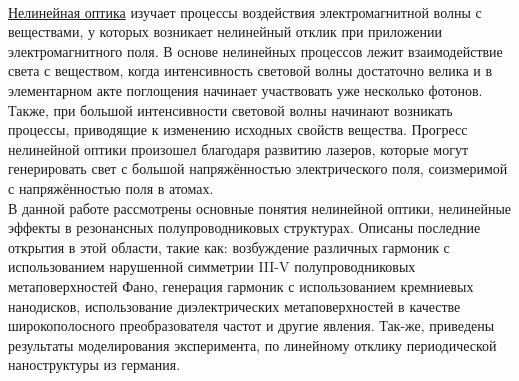 \\
\hspace*{2mm}
\underline{Нелинейная оптика} изучает процессы воздействия электромагнитной волны с веществами, у которых возникает нелинейный отклик при приложении  электромагнитного поля. В основе нелинейных процессов лежит  взаимодействие света с веществом, когда интенсивность световой волны достаточно велика и в элементарном акте поглощения начинает участвовать уже несколько фотонов. Также, при большой интенсивности световой волны  начинают возникать процессы, приводящие к изменению исходных свойств вещества. Прогресс нелинейной оптики произошел благодаря развитию лазеров, которые могут генерировать свет с большой напряжённостью электрического поля, соизмеримой с напряжённостью поля в атомах.
\\
\hspace*{2mm}
В данной работе рассмотрены основные понятия нелинейной оптики, нелинейные эффекты в резонансных полупроводниковых структурах. Описаны последние открытия в этой области, такие как: возбуждение различных гармоник с использованием нарушенной симметрии III-V полупроводниковых метаповерхностей Фано, генерация гармоник с использованием кремниевых нанодисков, использование диэлектрических метаповерхностей в качестве широкополосного преобразователя частот и другие явления. Так-же, приведены результаты моделирования эксперимента, по линейному отклику периодической наноструктуры из германия.

